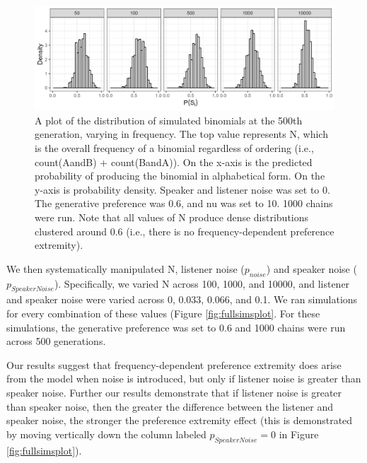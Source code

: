 \documentclass[10pt, letterpaper, hidelinks]{article}
\newenvironment{CodeChunk}{}{}
\begin{document}
\begin{CodeChunk}
\begin{figure}[tb]

{\centering \includegraphics[width=1\linewidth]{Figures/noNoise} 

}

\caption[A plot of the distribution of simulated binomials at the 500th generation, varying in frequency]{A plot of the distribution of simulated binomials at the 500th generation, varying in frequency. The top value represents N, which is the overall frequency of a binomial regardless of ordering (i.e., count(AandB) + count(BandA)). On the x-axis is the predicted probability of producing the binomial in alphabetical form. On the y-axis is probability density. Speaker and listener noise was set to 0. The generative preference was 0.6, and nu was set to 10. 1000 chains were run. Note that all values of N produce dense distributions clustered around 0.6 (i.e., there is no frequency-dependent preference extremity).}\label{fig:noNoisePlot}
\end{figure}
\end{CodeChunk}

We then systematically manipulated N, listener noise (\(p_{noise}\)) and
speaker noise (\(p_{SpeakerNoise}\)). Specifically, we varied N across
100, 1000, and 10000, and listener and speaker noise were varied across
0, 0.033, 0.066, and 0.1. We ran simulations for every combination of
these values (Figure \ref{fig:fullsimsplot}. For these simulations, the
generative preference was set to 0.6 and 1000 chains were run across 500
generations.

Our results suggest that frequency-dependent preference extremity does
arise from the model when noise is introduced, but only if listener
noise is greater than speaker noise. Further our results demonstrate
that if listener noise is greater than speaker noise, then the greater
the difference between the listener and speaker noise, the stronger the
preference extremity effect (this is demonstrated by moving vertically
down the column labeled \(p_{SpeakerNoise} = 0\) in Figure
\ref{fig:fullsimsplot}).
\end{document}

